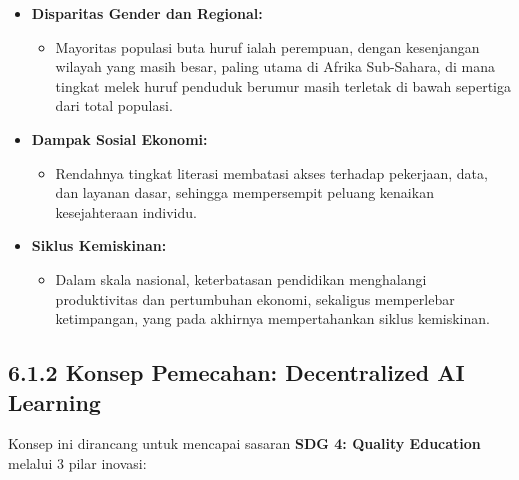\documentclass[
  letterpaper,
  DIV=11,
  numbers=noendperiod]{scrreprt}
\providecommand{\tightlist}{%
  \setlength{\itemsep}{0pt}\setlength{\parskip}{0pt}}
\begin{document}
\begin{itemize}
\tightlist
\item
  \textbf{Disparitas Gender dan Regional:}

  \begin{itemize}
  \tightlist
  \item
    Mayoritas populasi buta huruf ialah perempuan, dengan kesenjangan
    wilayah yang masih besar, paling utama di Afrika Sub-Sahara, di mana
    tingkat melek huruf penduduk berumur masih terletak di bawah
    sepertiga dari total populasi.
  \end{itemize}
\item
  \textbf{Dampak Sosial Ekonomi:}

  \begin{itemize}
  \tightlist
  \item
    Rendahnya tingkat literasi membatasi akses terhadap pekerjaan, data,
    dan layanan dasar, sehingga mempersempit peluang kenaikan
    kesejahteraan individu.
  \end{itemize}
\item
  \textbf{Siklus Kemiskinan:}

  \begin{itemize}
  \tightlist
  \item
    Dalam skala nasional, keterbatasan pendidikan menghalangi
    produktivitas dan pertumbuhan ekonomi, sekaligus memperlebar
    ketimpangan, yang pada akhirnya mempertahankan siklus kemiskinan.
  \end{itemize}
\end{itemize}

\subsection{6.1.2 Konsep Pemecahan: Decentralized AI
Learning}\label{konsep-pemecahan-decentralized-ai-learning}

Konsep ini dirancang untuk mencapai sasaran \textbf{SDG 4: Quality
Education} melalui 3 pilar inovasi:
\end{document}
